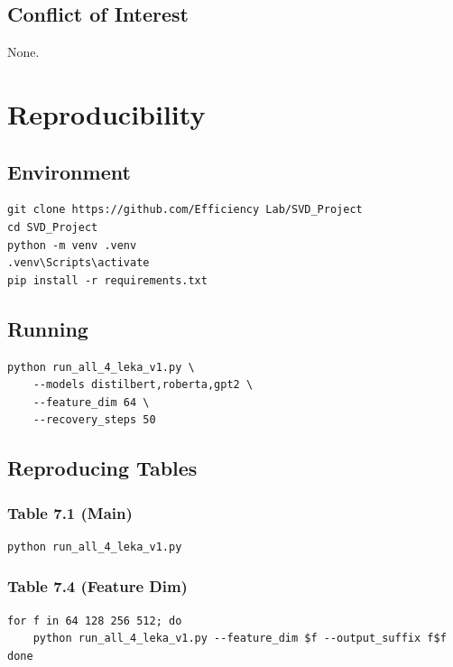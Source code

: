 \subsection{Conflict of Interest}

None.



\section{Reproducibility}

\subsection{Environment}

\begin{lstlisting}
git clone https://github.com/Efficiency Lab/SVD_Project
cd SVD_Project
python -m venv .venv
.venv\Scripts\activate
pip install -r requirements.txt
\end{lstlisting}

\subsection{Running}

\begin{lstlisting}
python run_all_4_leka_v1.py \
    --models distilbert,roberta,gpt2 \
    --feature_dim 64 \
    --recovery_steps 50
\end{lstlisting}

\subsection{Reproducing Tables}

\subsubsection{Table 7.1 (Main)}
\begin{lstlisting}
python run_all_4_leka_v1.py
\end{lstlisting}

\subsubsection{Table 7.4 (Feature Dim)}
\begin{lstlisting}
for f in 64 128 256 512; do
    python run_all_4_leka_v1.py --feature_dim $f --output_suffix f$f
done
\end{lstlisting}

